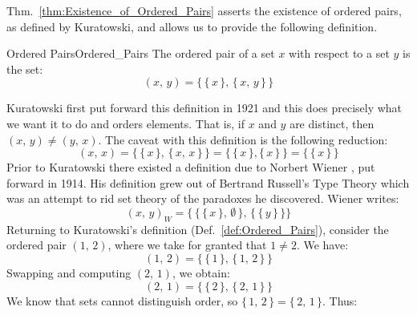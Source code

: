         Thm.~\ref{thm:Existence_of_Ordered_Pairs} asserts the existence of
        ordered pairs, as defined by Kuratowski, and allows
        us to provide the following definition.
        \begin{fdefinition}{Ordered Pairs}{Ordered_Pairs}
            The \gls{ordered pair} of a \gls{set} $x$ with respect to a set
            $y$ is the set:
            \begin{equation*}
                (x,\,y)=\big\{\,\{\,x\,\},\,\{\,x,\,y\,\}\,\big\}
            \end{equation*}
        \end{fdefinition}
        Kuratowski first put forward this definition
        in 1921 and this does precisely what we want it to do and orders
        elements. That is, if $x$ and $y$ are distinct, then
        $(x,\,y)\ne(y,\,x)$. The caveat with this definition is the following
        reduction:
        \begin{equation}
            (x,\,x)
            =\big\{\,\{\,x\,\},\,\{\,x,\,x\,\}\,\big\}
            =\big\{\,\{\,x\,\},\{\,x\,\}\,\big\}
            =\big\{\,\{\,x\,\}\,\big\}
        \end{equation}
        Prior to Kuratowski there existed a definition due to Norbert Wiener%
        , put forward in 1914. His definition grew out of
        Bertrand Russell's Type
        Theory which was an attempt to rid set theory of the
        paradoxes he discovered. Wiener writes:
        \begin{equation}
            (x,\,y)_{W}=\Big\{\,\big\{\,\{\,x\,\},\,\emptyset\,\big\},\,
                                \big\{\,\{\,y\,\}\,\big\}\Big\}
        \end{equation}
        Returning to Kuratowski's definition (Def.~\ref{def:Ordered_Pairs}),
        consider the ordered pair $(1,\,2)$, where we take for granted that
        $1\ne{2}$. We have:
        \begin{equation}
            (1,\,2)=\big\{\,\{\,1\,\},\,\{\,1,\,2\,\}\,\big\}
        \end{equation}
        Swapping and computing $(2,\,1)$, we obtain:
        \begin{equation}
            (2,\,1)=\big\{\,\{\,2\,\},\,\{\,2,\,1\,\}\,\big\}
        \end{equation}
        We know that sets cannot distinguish order, so
        $\{\,1,\,2\,\}=\{\,2,\,1\,\}$. Thus:
